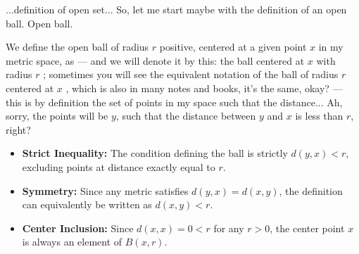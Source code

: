 \begin{speech}[00:02:24 - 00:03:54]
...definition of open set... So, let me start maybe with the definition of an open ball. Open ball. 

We define the open ball of radius $r$ positive,  centered at a given point $x$ in my metric space,  as --- and we will denote it by this: the ball centered at $x$ with radius $r$ ; sometimes you will see the equivalent notation of the ball of radius $r$ centered at $x$ , which is also in many notes and books, it's the same, okay? --- this is by definition the set of points in my space such that the distance... Ah, sorry, the points will be $y$, such that the distance between $y$ and $x$ is less than $r$, right? 
\end{speech}

\begin{content}


\begin{steps}
\begin{itemize}
    \item \textbf{Strict Inequality:} The condition defining the ball is strictly $d(y, x) < r$, excluding points at distance exactly equal to $r$.
    \item \textbf{Symmetry:} Since any metric satisfies $d(y, x) = d(x, y)$, the definition can equivalently be written as $d(x, y) < r$.
    \item \textbf{Center Inclusion:} Since $d(x, x) = 0 < r$ for any $r > 0$, the center point $x$ is always an element of $B(x, r)$.
\end{itemize}
\end{steps}
\end{content}

